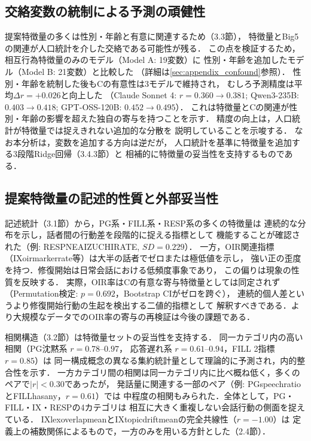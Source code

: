 \documentclass[dvipdfmx,11pt,a4paper]{bxjsarticle}
\renewcommand{\_}{\paperorigunderscore\allowbreak}%
\begin{document}
\subsection{交絡変数の統制による予測の頑健性}


提案特徴量の多くは性別・年齢と有意に関連するため（3.3節），
特徴量とBig5の関連が人口統計を介した交絡である可能性が残る．
この点を検証するため，相互行為特徴量のみのモデル（Model A: 19変数）に
性別・年齢を追加したモデル（Model B: 21変数）と比較した
（詳細は\ref{sec:appendix_confound}参照）．
性別・年齢を統制した後もCの有意性は3モデルで維持され，
むしろ予測精度は平均$\Delta r = +0.026$と向上した
（Claude Sonnet 4: $r = 0.360 \to 0.381$;
Qwen3-235B: $0.403 \to 0.418$;
GPT-OSS-120B: $0.452 \to 0.495$）．
これは特徴量とCの関連が性別・年齢の影響を超えた独自の寄与を持つことを示す．
精度の向上は，人口統計が特徴量では捉えきれない追加的な分散を
説明していることを示唆する．
なお本分析は，変数を追加する方向は逆だが，
人口統計を基準に特徴量を追加する3段階Ridge回帰（3.4.3節）と
相補的に特徴量の妥当性を支持するものである．

\subsection{提案特徴量の記述的性質と外部妥当性}

記述統計（3.1節）から，PG系・FILL系・RESP系の多くの特徴量は
連続的な分布を示し，話者間の行動差を段階的に捉える指標として
機能することが確認された（例: RESP\_NE\_AIZUCHI\_RATE, $SD = 0.229$）．
一方，OIR関連指標（IX\_oirmarker\_rate等）は大半の話者でゼロまたは極低値を示し，
強い正の歪度を持つ．修復開始は日常会話における低頻度事象であり，
この偏りは現象の性質を反映する．
実際，OIR率はCの有意な寄与特徴量としては同定されず
（Permutation検定: $p = 0.692$，Bootstrap CIがゼロを跨ぐ），
連続的個人差というより修復開始行動の生起を検出する二値的指標として
解釈すべきである．より大規模なデータでのOIR率の寄与の再検証は今後の課題である．

相関構造（3.2節）は特徴量セットの妥当性を支持する．
同一カテゴリ内の高い相関（PG沈黙系 $r = 0.78$--$0.97$，
応答遅れ系 $r = 0.61$--$0.94$，FILL 2指標 $r = 0.85$）は
同一構成概念の異なる集約統計量として理論的に予測され，内的整合性を示す．
一方カテゴリ間の相関は同一カテゴリ内に比べ概ね低く，多くのペアで$|r| < 0.30$であったが，
発話量に関連する一部のペア（例: PG\_speech\_ratioとFILL\_has\_any，$r = 0.61$）では
中程度の相関もみられた．全体として，PG・FILL・IX・RESPの4カテゴリは
相互に大きく重複しない会話行動の側面を捉えている．
IX\_lex\_overlap\_meanとIX\_topic\_drift\_meanの完全共線性（$r = -1.00$）は
定義上の補数関係によるもので，一方のみを用いる方針とした（2.4節）．
\end{document}
